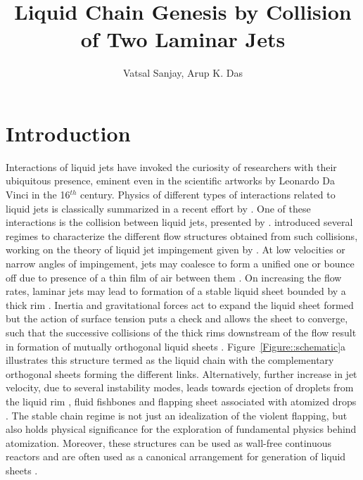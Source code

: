 \documentclass{jfm}
\title{Liquid Chain Genesis by Collision of Two Laminar Jets}
\author{Vatsal Sanjay,
  Arup K. Das\corresp{\email{arupdas80@gmail.com}}}
\affiliation{Department of Mechanical and Industrial Engineering, Indian Institute of Technology, Roorkee}
\begin{document}
\newcommand{\MarkerCircleRed}{\raisebox{0.5pt}{\tikz{\node[draw,scale=0.4,circle,fill=red!100!red](){};}}}
\newcommand{\MarkerSquareRed}{\raisebox{0.5pt}{\tikz{\node[draw,scale=0.4,regular polygon, regular polygon sides=4,fill=black!20!red](){};}}}
\newcommand{\MarkerDiamondBlack}{\raisebox{0pt}{\tikz{\node[draw,scale=0.4,diamond,fill=black!100!](){};}}}

\maketitle
\begin{abstract}
\end{abstract}
\lipsum[1]
\begin{keywords}
\end{keywords}
\section{Introduction}
Interactions of liquid jets have invoked the curiosity of researchers with their ubiquitous presence, eminent even in the scientific artworks by Leonardo Da Vinci in the 16$^{th}$ century. Physics of different types of interactions related to liquid jets is classically summarized in a recent effort by \cite{eggers2008physics}. One of these interactions is the collision between liquid jets, presented by \cite{rayleigh1879capillary}. \cite{bush2004collision} introduced several regimes to characterize the different flow structures obtained from such collisions, working on the theory of liquid jet impingement given by \cite{taylor1960formation}. At low velocities or narrow angles of impingement, jets may coalesce to form a unified one or bounce off due to presence of a thin film of air between them \citep{wadhwa2013noncoalescence}. On increasing the flow rates, laminar jets may lead to formation of a stable liquid sheet bounded by a thick rim \citep{yang2014liquid}. Inertia and gravitational forces act to expand the liquid sheet formed but the action of surface tension puts a check and allows the sheet  to converge, such that the successive collisions of the thick rims downstream of the flow result in formation of mutually orthogonal liquid sheets \citep{bush2004collision}. Figure~\ref{Figure::schematic}a illustrates this structure termed as the liquid chain with the complementary orthogonal sheets forming the different links. Alternatively, further increase in jet velocity, due to several instability modes, leads towards ejection of droplets from the liquid rim \citep{bremond2006atomization}, fluid fishbones \citep{bush2004collision} and flapping sheet \citep{villermaux2002life} associated with atomized drops \citep{ibrahim1991impinging}. The stable chain regime is not just an idealization of the violent flapping, but also holds physical significance for the exploration of fundamental physics behind atomization. Moreover, these structures can be used as wall-free continuous reactors \citep{erni2013free} and are often used as a canonical arrangement for generation of liquid sheets \citep{dombrowski1954photographic}. \\
\end{document}
